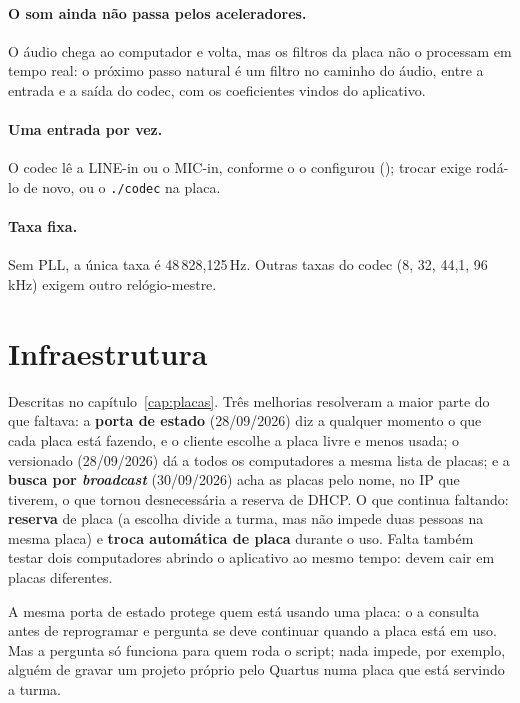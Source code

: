 \paragraph{O som ainda não passa pelos aceleradores.} O áudio chega ao
computador e volta, mas os filtros da placa não o processam em tempo real: o
próximo passo natural é um filtro no caminho do áudio, entre a entrada e a
saída do codec, com os coeficientes vindos do aplicativo.

\paragraph{Uma entrada por vez.} O codec lê a LINE-in ou o MIC-in, conforme o
 o configurou (); trocar exige rodá-lo de novo, ou
o \texttt{./codec} na placa.

\paragraph{Taxa fixa.} Sem PLL, a única taxa é 48\,828,125\,Hz. Outras taxas do
codec (8, 32, 44,1, 96\,kHz) exigem outro relógio-mestre.

\section{Infraestrutura}

Descritas no capítulo~\ref{cap:placas}. Três melhorias resolveram a maior
parte do que faltava: a \textbf{porta de estado} (28/09/2026) diz a qualquer
momento o que cada placa está fazendo, e o cliente escolhe a placa livre e menos
usada; o \textbf{} versionado (28/09/2026) dá a todos os
computadores a mesma lista de placas; e a \textbf{busca por \emph{broadcast}}
(30/09/2026) acha as placas pelo nome, no IP que tiverem, o que tornou
desnecessária a reserva de DHCP. O que continua faltando: \textbf{reserva} de
placa (a escolha divide a turma, mas não impede duas pessoas na mesma placa) e
\textbf{troca automática de placa} durante o uso. Falta também testar dois
computadores abrindo o aplicativo ao mesmo tempo: devem cair em placas
diferentes.

A mesma porta de estado protege quem está usando uma placa: o
 a consulta antes de reprogramar e pergunta se deve
continuar quando a placa está em uso. Mas a pergunta só funciona para quem roda
o script; nada impede, por exemplo, alguém de gravar um projeto próprio pelo
Quartus numa placa que está servindo a turma.


